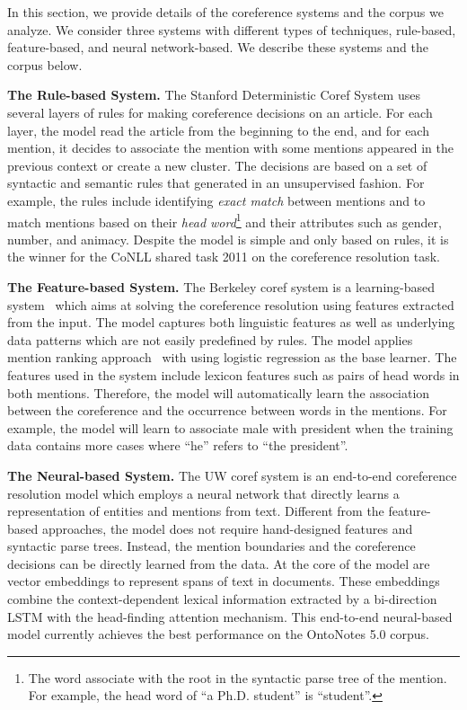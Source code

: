 
In this section, we provide details of the coreference systems and the corpus we analyze. We consider three systems with different types of techniques, rule-based, feature-based, and neural network-based. We describe these systems and the corpus below. 
 
\textbf{The Rule-based System.}
The Stanford Deterministic Coref System uses several layers of rules for making coreference decisions on an article. For each layer, the model read the article from the beginning to the end, and for each mention, it decides to associate the mention with some mentions appeared in the previous context or create a new cluster. The decisions are based on a set of syntactic and semantic rules that generated in an unsupervised fashion. For example, the rules include  identifying  \textit{exact match} between mentions and to match mentions based on their \textit{head word}\footnote{The word associate with the root in the syntactic parse tree of the mention. For example, the head word of ``a Ph.D. student'' is ``student''.} and their attributes such as gender, number, and animacy. 
Despite the model is simple and only based on rules, it is the winner for the CoNLL shared task 2011 on the coreference resolution task.

\textbf{The Feature-based System.}
The Berkeley coref system is a learning-based system~\cite{DurrettKlein2013} which aims at solving the coreference resolution using features extracted from the input. The model captures both linguistic features as well as underlying data patterns which are not easily predefined by rules. The model applies mention ranking approach~\cite{denis2008specialized} with using logistic regression as the base learner. The features used in the system include lexicon features such as 
pairs of head words in both mentions. Therefore, the model will automatically learn the association between the coreference and the occurrence between words in the mentions. For example, the model will learn to associate male with president when the training data contains more cases where ``he'' refers to ``the president''.
 
\textbf{The Neural-based System.}
The UW coref system is an end-to-end coreference resolution model which employs a neural network that directly learns a representation of entities and mentions from text. Different from the feature-based approaches, the model does not require hand-designed features and
syntactic parse trees. Instead, the mention boundaries and the coreference decisions can be directly learned from the data.
At the core of the model are vector embeddings to represent spans of text in  documents. These embeddings combine the context-dependent lexical information extracted by a bi-direction LSTM  with the  head-finding attention mechanism.
This end-to-end neural-based model currently achieves the best performance on the OntoNotes 5.0 corpus. 

